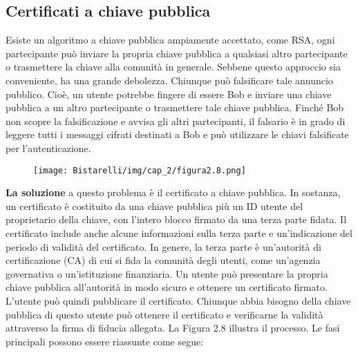 \subsection{Certificati a chiave pubblica}
Esiste un algoritmo a chiave pubblica ampiamente accettato, come RSA, ogni partecipante può inviare la propria chiave pubblica a qualsiasi altro partecipante o trasmettere la chiave alla comunità in generale. Sebbene questo approccio sia conveniente, ha una grande debolezza. Chiunque può falsificare tale annuncio pubblico. Cioè, un utente potrebbe fingere di essere Bob e inviare una chiave pubblica a un altro partecipante o trasmettere tale chiave pubblica. Finché Bob non scopre la falsificazione e avvisa gli altri partecipanti, il falsario è in grado di leggere tutti i messaggi cifrati destinati a Bob e può utilizzare le chiavi falsificate per l'autenticazione.

\singlespacing

\begin{figure}[H]
	\centering
    \texttt{[image: Bistarelli/img/cap\_2/figura2.8.png]}
\end{figure}

\textbf{La soluzione} a questo problema è il certificato a chiave pubblica. In sostanza, un certificato è costituito da una chiave pubblica più un ID utente del proprietario della chiave, con l'intero blocco firmato da una terza parte fidata. Il certificato include anche alcune informazioni sulla terza parte e un'indicazione del periodo di validità del certificato. In genere, la terza parte è un'autorità di certificazione (CA) di cui si fida la comunità degli utenti, come un'agenzia governativa o un'istituzione finanziaria. Un utente può presentare la propria chiave pubblica all'autorità in modo sicuro e ottenere un certificato firmato. L'utente può quindi pubblicare il certificato. Chiunque abbia bisogno della chiave pubblica di questo utente può ottenere il certificato e verificarne la validità attraverso la firma di fiducia allegata. La Figura 2.8 illustra il processo. Le fasi principali possono essere riassunte come segue:

